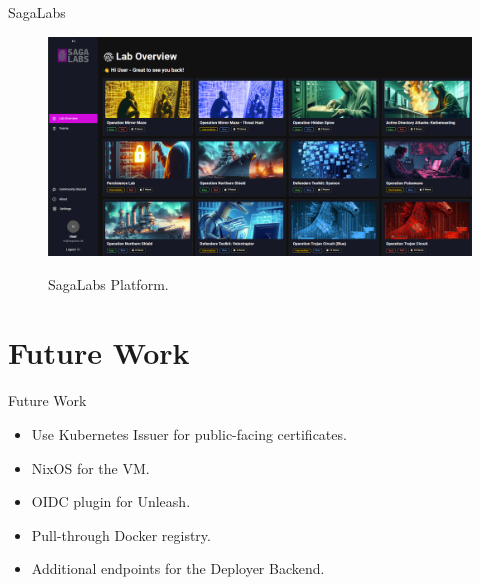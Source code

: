 \documentclass{beamer}
\begin{document}
\begin{frame}{SagaLabs}
    \begin{figure}
        \centering
        \href{https://sagalabs.dk/}{%
            \includegraphics[width=1\textwidth]{./images/SagaLabs.png}
        }
        \caption{SagaLabs Platform.}
    \end{figure}
\end{frame}

\section{Future Work}
\begin{frame}{Future Work}
    \begin{itemize}
        \item Use Kubernetes Issuer for public-facing certificates.
        \item NixOS for the VM.
        \item OIDC plugin for Unleash.
        \item Pull-through Docker registry.
        \item Additional endpoints for the Deployer Backend.
    \end{itemize}
\end{frame}
\end{document}
